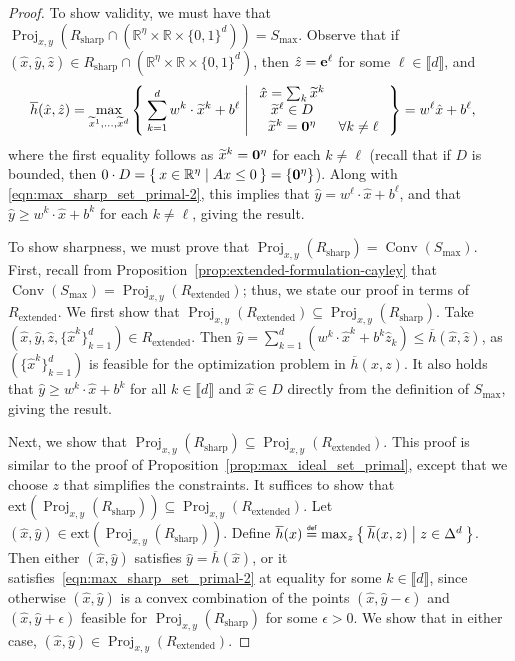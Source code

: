 \documentclass[smallextended]{svjour3}
\newcommand{\bbR}{\mathbb{R}}
\newcommand{\Conv}{\operatorname{Conv}}
\newcommand{\Proj}{\operatorname{Proj}}
\newcommand\defeq{\mathrel{\overset{\makebox[0pt]{\mbox{\normalfont\tiny\sffamily def}}}{=}}}
\newcommand{\tx}{\widetilde{x}}
\newcommand{\Rextended}{R_{\operatorname{extended}}}
\newcommand{\Rsharp}{R_{\operatorname{sharp}}}
\newcommand{\Smax}{S_{\operatorname{max}}}
\renewcommand{\bar}[1]{\overline{#1}}
\begin{document}
\begin{proof}
To show validity, we must have that $\Proj_{x,y}\left(\Rsharp \cap (\bbR^{\eta} \times \bbR \times \{0,1\}^d)\right) = \Smax$.
Observe that if $(\hat{x},\hat{y},\hat{z}) \in \Rsharp \cap (\bbR^{\eta} \times \bbR \times \{0,1\}^d)$, then $\hat{z} = {\bf e}^\ell$ for some $\ell \in \llbracket d \rrbracket$, and
\begin{align*}
    \bar{h}(\hat{x},\hat{z}) &= \max_{\tx^1, \ldots, \tx^d}\Set{\sum_{k=1}^d w^k \cdot \tx^k + b^\ell | \begin{array}{cc} \hat{x} = \sum_k \tx^k & \\ \tx^\ell \in D & \\ \tx^k = {\bf 0}^\eta &\forall k \neq \ell \end{array}} = w^\ell \hat{x} + b^\ell,
\end{align*}
where the first equality follows as $\tx^k = {\bf 0}^\eta$ for each $k \neq \ell$ (recall that if $D$ is bounded, then $0 \cdot D = \Set{x \in \bbR^\eta | Ax \leq 0} = \{{\bf 0}^\eta\}$).
Along with \eqref{eqn:max_sharp_set_primal-2}, this implies that $\hat{y} = w^\ell \cdot \hat{x} + b^\ell$, and that $\hat{y} \geq w^k \cdot \hat{x} + b^k$ for each $k \neq \ell$, giving the result.

To show sharpness, we must prove that $\Proj_{x,y}(\Rsharp) = \Conv(\Smax)$. First, recall from Proposition~\ref{prop:extended-formulation-cayley} that $\Conv(\Smax) = \Proj_{x,y}(\Rextended)$; thus, we state our proof in terms of $\Rextended$.
We first show that $\Proj_{x,y}(\Rextended) \subseteq \Proj_{x,y}(\Rsharp)$. Take $(\hat{x}, \hat{y}, \hat{z}, \{\hat{x}^k\}_{k=1}^d) \in \Rextended$. Then $\hat{y} = \sum_{k=1}^d (w^k \cdot \hat{x}^k + b^k\hat{z}_k) \leq \bar{h}(\hat{x}, \hat{z})$, as $(\{\hat{x}^k\}_{k=1}^d)$ is feasible for the optimization problem in $\bar{h}(x, z)$. It also holds that $\hat{y} \geq w^k \cdot \hat{x} + b^k$ for all $k \in \llbracket d \rrbracket$ and $\hat{x} \in D$ directly from the definition of $\Smax$, giving the result.

Next, we show that $\Proj_{x,y}(\Rsharp) \subseteq \Proj_{x,y}(\Rextended)$. This proof is similar to the proof of Proposition~\ref{prop:max_ideal_set_primal}, except that we choose $z$ that simplifies the constraints. It suffices to show that $\text{ext}(\Proj_{x,y}(\Rsharp)) \subseteq \Proj_{x,y}(\Rextended)$. Let $(\hat{x}, \hat{y}) \in \text{ext}(\Proj_{x,y}(\Rsharp))$. Define $\bar{h}(x) \defeq \max_{z} \Set{\bar{h}(x, z) | z \in \Delta^d}$. Then either $(\hat{x}, \hat{y})$ satisfies $\hat{y} = \bar{h}(\hat{x})$, or it satisfies~\eqref{eqn:max_sharp_set_primal-2} at equality for some $k \in \llbracket d \rrbracket$, since otherwise $(\hat{x}, \hat{y})$ is a convex combination of the points $(\hat{x}, \hat{y} - \epsilon)$ and $(\hat{x}, \hat{y} + \epsilon)$ feasible for $\Proj_{x,y}(\Rsharp)$ for some $\epsilon > 0$. We show that in either case, $(\hat{x}, \hat{y}) \in \Proj_{x,y}(\Rextended)$.


\end{proof}
\end{document}
